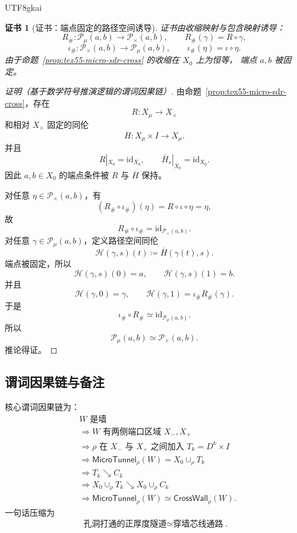 \documentclass[12pt]{article}
\newtheorem{Certificate}{证书}[section]
\newcommand{\MicroTunnel}{\mathsf{MicroTunnel}}
\newcommand{\CrossWall}{\mathsf{CrossWall}}
\newcommand{\Path}{\mathcal P}
\newcommand{\DefEq}{\coloneqq}
\newcommand{\id}{\mathrm{id}}
\newcommand{\incl}{\iota}
\begin{document}
\begin{CJK*}{UTF8}{gkai}
\begin{Certificate}[证书：端点固定的路径空间诱导]
\label{cert:tex55-path-space}
证书由收缩映射与包含映射诱导：
\[
  R_{\#}:\Path_{\mu}(a,b)\to\Path_{\times}(a,b),
  \qquad
  R_{\#}(\gamma)=R\circ\gamma,
\]
\[
  \incl_{\#}:\Path_{\times}(a,b)\to\Path_{\mu}(a,b),
  \qquad
  \incl_{\#}(\eta)=\incl\circ\eta.
\]
由于命题~\ref{prop:tex55-micro-sdr-cross} 的收缩在 \(X_0\) 上为恒等，
端点 \(a,b\) 被固定。
\end{Certificate}

\begin{proof}[证明（基于数学符号推演逻辑的谓词因果链）]
由命题~\ref{prop:tex55-micro-sdr-cross}，存在
\[
  R:X_{\mu}\to X_{\times}
\]
和相对 \(X_{\times}\) 固定的同伦
\[
  \overline H:X_{\mu}\times I\to X_{\mu}.
\]
并且
\[
  R|_{X_0}=\id_{X_0},
  \qquad
  \overline H_s|_{X_0}=\id_{X_0}.
\]
因此 \(a,b\in X_0\) 的端点条件被 \(R\) 与 \(\overline H\) 保持。

对任意 \(\eta\in\Path_{\times}(a,b)\)，有
\[
  (R_{\#}\circ\incl_{\#})(\eta)
  =
  R\circ\incl\circ\eta
  =
  \eta,
\]
故
\[
  R_{\#}\circ\incl_{\#}
  =
  \id_{\Path_{\times}(a,b)}.
\]
对任意 \(\gamma\in\Path_{\mu}(a,b)\)，定义路径空间同伦
\[
  \mathcal H(\gamma,s)(t)
  \DefEq
  \overline H(\gamma(t),s).
\]
端点被固定，所以
\[
  \mathcal H(\gamma,s)(0)=a,
  \qquad
  \mathcal H(\gamma,s)(1)=b.
\]
并且
\[
  \mathcal H(\gamma,0)=\gamma,
  \qquad
  \mathcal H(\gamma,1)=\incl_{\#}R_{\#}(\gamma).
\]
于是
\[
  \incl_{\#}\circ R_{\#}
  \simeq
  \id_{\Path_{\mu}(a,b)}.
\]
所以
\[
  \Path_{\mu}(a,b)\simeq \Path_{\times}(a,b).
\]
推论得证。
\end{proof}

\subsection{谓词因果链与备注}
\label{subsec:tex55-predicate-chain}

核心谓词因果链为：
\[
\begin{aligned}
  &W\text{ 是墙}\\
  &\Longrightarrow
  W\text{ 有两侧端口区域 }X_-,X_+\\
  &\Longrightarrow
  \rho\text{ 在 }X_-\text{ 与 }X_+\text{ 之间加入 }T_k=D^k\times I\\
  &\Longrightarrow
  \MicroTunnel_{\rho}(W)=X_0\cup_{\rho}T_k\\
  &\Longrightarrow
  T_k\searrow C_k\\
  &\Longrightarrow
  X_0\cup_{\rho}T_k\searrow X_0\cup_{\rho}C_k\\
  &\Longrightarrow
  \MicroTunnel_{\rho}(W)\simeq\CrossWall_{\rho}(W).
\end{aligned}
\]
一句话压缩为
\[
  \boxed{
  \text{孔洞打通的正厚度隧道}
  \simeq
  \text{穿墙芯线通路}
  }.
\]


\end{CJK*}
\end{document}
